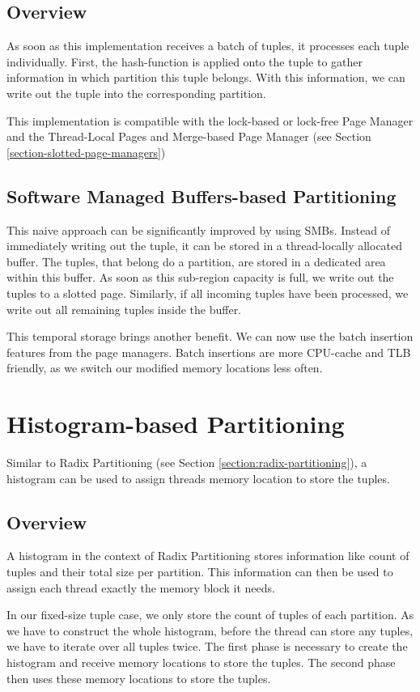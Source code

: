 \subsection{Overview}
As soon as this implementation receives a batch of tuples, it processes each tuple individually.
First, the hash-function is applied onto the tuple to gather information in which partition this tuple belongs.
With this information, we can write out the tuple into the corresponding partition.

This implementation is compatible with the lock-based or lock-free Page Manager and the Thread-Local Pages and Merge-based Page Manager (see Section \ref{section-slotted-page-managers})

\subsection{Software Managed Buffers-based Partitioning}

This naive approach can be significantly improved by using \acfp{SMB}.
Instead of immediately writing out the tuple, it can be stored in a thread-locally allocated buffer.
The tuples, that belong do a partition, are stored in a dedicated area within this buffer.
As soon as this sub-region capacity is full, we write out the tuples to a slotted page.
Similarly, if all incoming tuples have been processed, we write out all remaining tuples inside the buffer.

This temporal storage brings another benefit.
We can now use the batch insertion features from the page managers.
Batch insertions are more \ac{CPU}-cache and \ac{TLB} friendly, as we switch our modified memory locations less often.

\section{Histogram-based Partitioning}
Similar to Radix Partitioning (see Section \ref{section:radix-partitioning}), a histogram can be used to assign threads memory location to store the tuples.
\subsection{Overview}
A histogram in the context of Radix Partitioning stores information like count of tuples and their total size per partition.
This information can then be used to assign each thread exactly the memory block it needs.

In our fixed-size tuple case, we only store the count of tuples of each partition.
As we have to construct the whole histogram, before the thread can store any tuples, we have to iterate over all tuples twice.
The first phase is necessary to create the histogram and receive memory locations to store the tuples.
The second phase then uses these memory locations to store the tuples.


